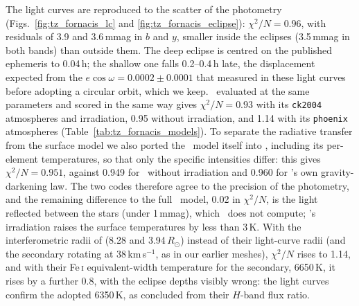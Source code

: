 The light curves are reproduced to the scatter of the photometry
(Figs.~\ref{fig:tz_fornacis_lc} and \ref{fig:tz_fornacis_eclipse}): $\chi^2/N = 0.96$, with residuals of
3.9 and 3.6\,mmag in $b$ and $y$, smaller inside the eclipses (3.5\,mmag in both bands) than outside them.
The deep eclipse is centred on the published ephemeris to 0.04\,h; the shallow one falls 0.2--0.4\,h late,
the displacement expected from the $e\cos\omega = 0.0002 \pm 0.0001$ that \citet{Andersen1991} measured in
these light curves before adopting a circular orbit, which we keep.
\phoebe\ evaluated at the same parameters and scored in the same way gives $\chi^2/N = 0.93$ with its
\texttt{ck2004} atmospheres and irradiation, 0.95 without irradiation, and 1.14 with its \texttt{phoenix}
atmospheres (Table~\ref{tab:tz_fornacis_models}). To separate the radiative transfer from the surface
model we also ported the \phoebe\ model itself into \spice, including its per-element temperatures, so
that only the specific intensities differ: this gives $\chi^2/N = 0.951$, against 0.949 for \phoebe\
without irradiation and 0.960 for \spice's own gravity-darkening law. The two codes therefore agree to the
precision of the photometry, and the remaining difference to the full \phoebe\ model, 0.02 in
$\chi^2/N$, is the light reflected between the stars (under 1\,mmag), which \spice\ does not compute;
\phoebe's irradiation raises the surface temperatures by less than 3\,K. With the interferometric radii of
\citet{tz_fornacis_orbit} (8.28 and 3.94\,$R_\odot$) instead of their light-curve radii (and the secondary
rotating at 38\,km\,s$^{-1}$, as in our earlier meshes), $\chi^2/N$ rises to 1.14, and with their Fe\,\textsc{i} equivalent-width temperature for the secondary, 6650\,K, it rises
by a further 0.8, with the eclipse depths visibly wrong: the light curves confirm the adopted 6350\,K, as
\citet{tz_fornacis_orbit} concluded from their $H$-band flux ratio.

